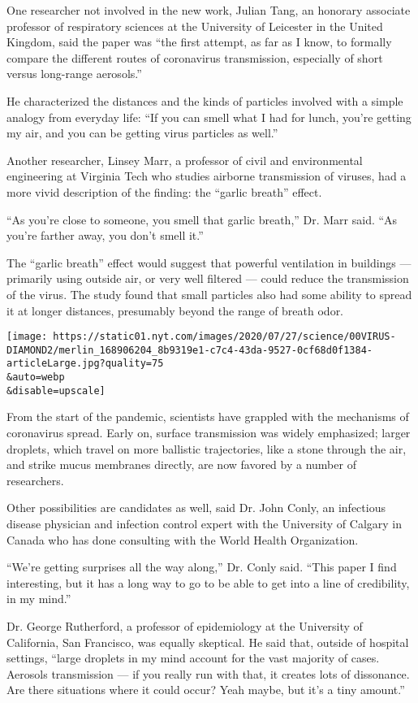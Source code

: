 One researcher not involved in the new work, Julian Tang, an honorary
associate professor of respiratory sciences at the University of
Leicester in the United Kingdom, said the paper was ``the first attempt,
as far as I know, to formally compare the different routes of
coronavirus transmission, especially of short versus long-range
aerosols.''

He characterized the distances and the kinds of particles involved with
a simple analogy from everyday life: ``If you can smell what I had for
lunch, you're getting my air, and you can be getting virus particles as
well.''

Another researcher, Linsey Marr, a professor of civil and environmental
engineering at Virginia Tech who studies airborne transmission of
viruses, had a more vivid description of the finding: the ``garlic
breath'' effect.

``As you're close to someone, you smell that garlic breath,'' Dr. Marr
said. ``As you're farther away, you don't smell it.''

The ``garlic breath'' effect would suggest that powerful ventilation in
buildings --- primarily using outside air, or very well filtered ---
could reduce the transmission of the virus. The study found that small
particles also had some ability to spread it at longer distances,
presumably beyond the range of breath odor.

\texttt{[image: https://static01.nyt.com/images/2020/07/27/science/00VIRUS-DIAMOND2/merlin\_168906204\_8b9319e1-c7c4-43da-9527-0cf68d0f1384-articleLarge.jpg?quality=75\\\&auto=webp\\\&disable=upscale]}

From the start of the pandemic, scientists have grappled with the
mechanisms of coronavirus spread. Early on, surface transmission was
widely emphasized; larger droplets, which travel on more ballistic
trajectories, like a stone through the air, and strike mucus membranes
directly, are now favored by a number of researchers.

Other possibilities are candidates as well, said Dr. John Conly, an
infectious disease physician and infection control expert with the
University of Calgary in Canada who has done consulting with the World
Health Organization.

``We're getting surprises all the way along,'' Dr. Conly said. ``This
paper I find interesting, but it has a long way to go to be able to get
into a line of credibility, in my mind.''

Dr. George Rutherford, a professor of epidemiology at the University of
California, San Francisco, was equally skeptical. He said that, outside
of hospital settings, ``large droplets in my mind account for the vast
majority of cases. Aerosols transmission --- if you really run with
that, it creates lots of dissonance. Are there situations where it could
occur? Yeah maybe, but it's a tiny amount.''

